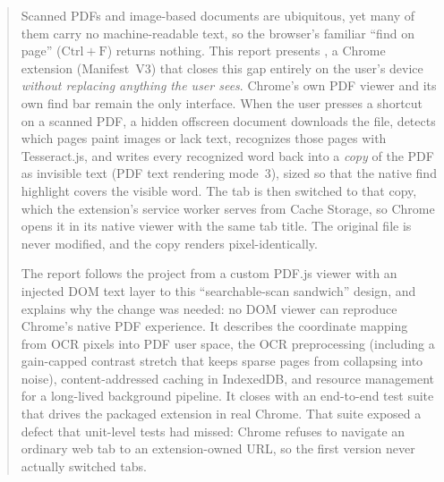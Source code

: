 \begin{abstract}
\noindent
Scanned PDFs and image-based documents are ubiquitous, yet many of them carry no
machine-readable text, so the browser's familiar ``find on page''
($\mathrm{Ctrl}{+}\mathrm{F}$) returns nothing. This report presents \proj{}, a
Chrome extension (Manifest~V3) that closes this gap entirely on the user's
device \emph{without replacing anything the user sees}. Chrome's own PDF viewer
and its own find bar remain the only interface. When the user presses a shortcut
on a scanned PDF, a hidden offscreen document downloads the file, detects which
pages paint images or lack text, recognizes those pages with Tesseract.js, and
writes every recognized word back into a \emph{copy} of the PDF as invisible text
(PDF text rendering mode~3), sized so that the native find highlight covers the
visible word. The tab is then switched to that copy, which the extension's service
worker serves from Cache Storage, so Chrome opens it in its native viewer with
the same tab title. The original file is never modified, and the copy renders
pixel-identically.

The report follows the project from a custom PDF.js viewer with an injected DOM
text layer to this ``searchable-scan sandwich'' design, and explains why the
change was needed: no DOM viewer can reproduce Chrome's native PDF experience.
It describes the coordinate mapping from OCR pixels into PDF user space, the OCR
preprocessing (including a gain-capped contrast stretch that keeps sparse pages
from collapsing into noise), content-addressed caching in IndexedDB, and
resource management for a long-lived background pipeline. It closes with an
end-to-end test suite that drives the packaged extension in real Chrome. That
suite exposed a defect that unit-level tests had missed: Chrome refuses to
navigate an ordinary web tab to an extension-owned  URL, so the
first version never actually switched tabs.
\end{abstract}
